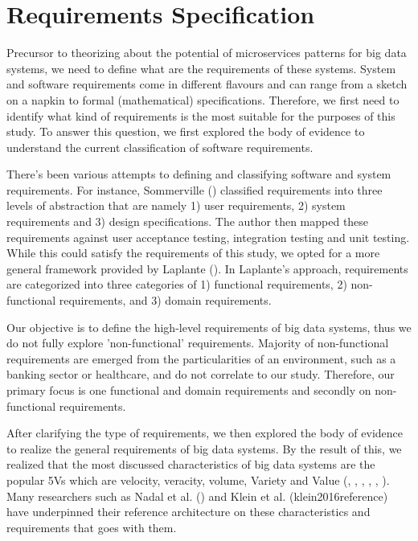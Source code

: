 \documentclass[conference]{IEEEtran}
\begin{document}

\section{Requirements Specification}

Precursor to theorizing about the potential of microservices patterns for big data systems, we need to define what are the requirements of these systems. System and software requirements come in different flavours and can range from a sketch on a napkin to formal (mathematical) specifications. Therefore, we first need to identify what kind of requirements is the most suitable for the purposes of this study. To answer this question, we first explored the body of evidence to understand the current classification of software requirements. 

There's been various attempts to defining and classifying software and system requirements. For instance, Sommerville (\cite{sommerville2011software}) classified requirements into three levels of abstraction that are namely 1) user requirements, 2) system requirements and 3) design specifications. The author then mapped these requirements against user acceptance testing, integration testing and unit testing. While this could satisfy the requirements of this study, we opted for a more general framework provided by Laplante (\cite{laplante2017requirements}). In Laplante's approach, requirements are categorized into three categories of 1) functional requirements, 2) non-functional requirements, and 3) domain requirements. 

Our objective is to define the high-level requirements of big data systems, thus we do not fully explore 'non-functional' requirements. Majority of non-functional requirements are emerged from the particularities of an environment, such as a banking sector or healthcare, and do not correlate to our study. Therefore, our primary focus is one functional and domain requirements and secondly on non-functional requirements.

After clarifying the type of requirements, we then explored the body of evidence to realize the general requirements of big data systems. By the result of this, we realized that the most discussed characteristics of big data systems are the popular 5Vs which are velocity, veracity, volume, Variety and Value (\cite{Demchenko2014}, \cite{Bughin2016}, \cite{Bahrami2015}, \cite{rad2017big}, \cite{Marz2015}, \cite{Chen2016a} ). Many researchers such as Nadal et al. (\cite{nadal2017software}) and Klein et al. (klein2016reference) have underpinned their reference architecture on these characteristics and requirements that goes with them. 
\end{document}

